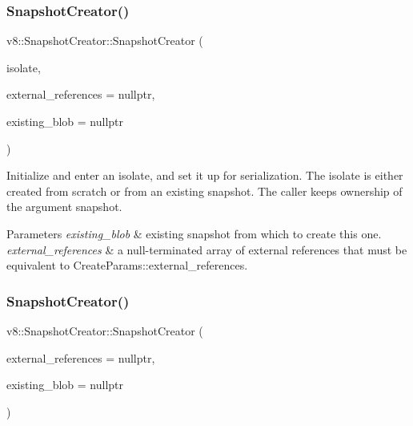 \subsubsection{\texorpdfstring{Snapshot\+Creator()}{SnapshotCreator()}\hspace{0.1cm}{\footnotesize\ttfamily [1/2]}}
{\footnotesize\ttfamily v8\+::\+Snapshot\+Creator\+::\+Snapshot\+Creator (\begin{DoxyParamCaption}\item[{\mbox{\hyperlink{classv8_1_1Isolate}{Isolate}} $\ast$}]{isolate,  }\item[{const intptr\+\_\+t $\ast$}]{external\+\_\+references = {\ttfamily nullptr},  }\item[{\mbox{\hyperlink{classv8_1_1StartupData}{Startup\+Data}} $\ast$}]{existing\+\_\+blob = {\ttfamily nullptr} }\end{DoxyParamCaption})}

Initialize and enter an isolate, and set it up for serialization. The isolate is either created from scratch or from an existing snapshot. The caller keeps ownership of the argument snapshot. 
\begin{DoxyParams}{Parameters}
{\em existing\+\_\+blob} & existing snapshot from which to create this one. \\
\hline
{\em external\+\_\+references} & a null-\/terminated array of external references that must be equivalent to Create\+Params\+::external\+\_\+references. \\
\hline
\end{DoxyParams}
\mbox{\label{classv8_1_1SnapshotCreator_acde479ff9349a5f61d3e1bd4bc78d833}} 
\subsubsection{\texorpdfstring{Snapshot\+Creator()}{SnapshotCreator()}\hspace{0.1cm}{\footnotesize\ttfamily [2/2]}}
{\footnotesize\ttfamily v8\+::\+Snapshot\+Creator\+::\+Snapshot\+Creator (\begin{DoxyParamCaption}\item[{const intptr\+\_\+t $\ast$}]{external\+\_\+references = {\ttfamily nullptr},  }\item[{\mbox{\hyperlink{classv8_1_1StartupData}{Startup\+Data}} $\ast$}]{existing\+\_\+blob = {\ttfamily nullptr} }\end{DoxyParamCaption})}

